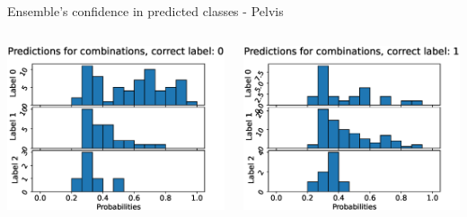 \begin{frame}[fragile]{Ensemble's confidence in predicted classes - Pelvis}
  \begin{columns}[T,onlytextwidth]
      \includegraphics[width=\textwidth]{files/figs/res/pelvis/pc0.eps}

      \includegraphics[width=\textwidth]{files/figs/res/pelvis/pc1.eps}


\end{columns}
\end{frame}
